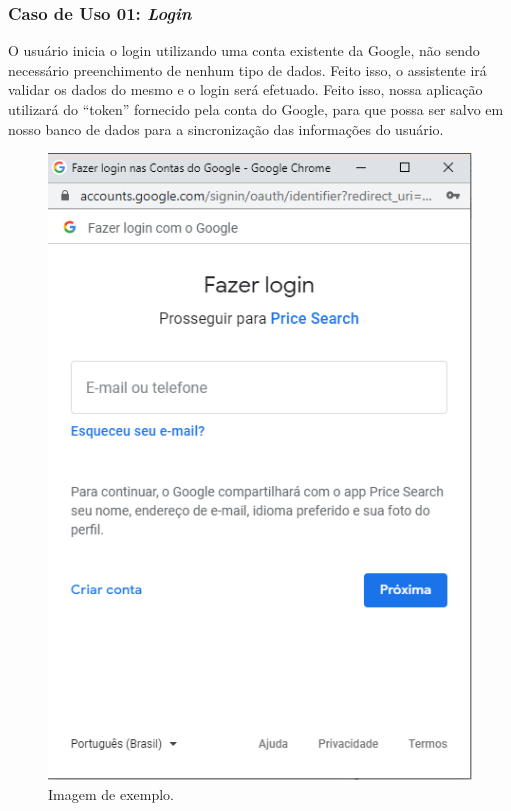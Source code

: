 \subsubsection{Caso de Uso 01: \textit{Login}}

O usuário inicia o login utilizando uma conta existente da Google, não sendo necessário preenchimento de nenhum tipo de dados. Feito isso, o assistente irá validar os dados do mesmo e o login será efetuado. Feito isso, nossa aplicação utilizará do ``token'' fornecido pela conta do Google, para que possa ser salvo em nosso banco de dados para a sincronização das informações do usuário.

\begin{figure}[!htb]
\centering
\caption{Imagem de exemplo.}
\includegraphics[width=\linewidth]{figuras/tela-login.png}
\end{figure}


